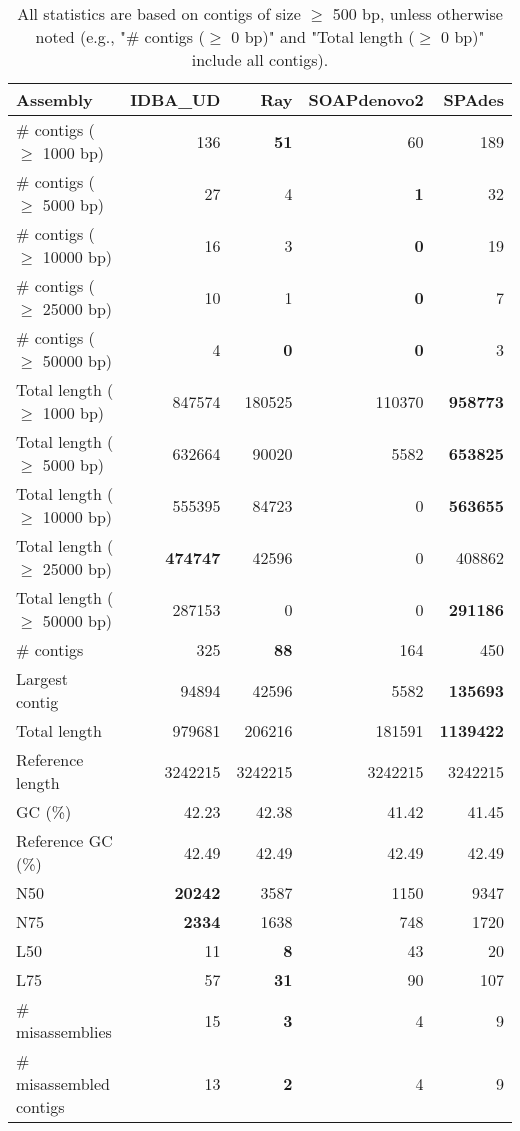 \documentclass[12pt,a4paper]{article}
\begin{document}
\begin{table}[ht]
\begin{center}
\caption{All statistics are based on contigs of size $\geq$ 500 bp, unless otherwise noted (e.g., "\# contigs ($\geq$ 0 bp)" and "Total length ($\geq$ 0 bp)" include all contigs).}
\begin{tabular}{|l*{4}{|r}|}
\hline
Assembly & IDBA\_UD & Ray & SOAPdenovo2 & SPAdes \\ \hline
\# contigs ($\geq$ 1000 bp) & 136 & {\bf 51} & 60 & 189 \\ \hline
\# contigs ($\geq$ 5000 bp) & 27 & 4 & {\bf 1} & 32 \\ \hline
\# contigs ($\geq$ 10000 bp) & 16 & 3 & {\bf 0} & 19 \\ \hline
\# contigs ($\geq$ 25000 bp) & 10 & 1 & {\bf 0} & 7 \\ \hline
\# contigs ($\geq$ 50000 bp) & 4 & {\bf 0} & {\bf 0} & 3 \\ \hline
Total length ($\geq$ 1000 bp) & 847574 & 180525 & 110370 & {\bf 958773} \\ \hline
Total length ($\geq$ 5000 bp) & 632664 & 90020 & 5582 & {\bf 653825} \\ \hline
Total length ($\geq$ 10000 bp) & 555395 & 84723 & 0 & {\bf 563655} \\ \hline
Total length ($\geq$ 25000 bp) & {\bf 474747} & 42596 & 0 & 408862 \\ \hline
Total length ($\geq$ 50000 bp) & 287153 & 0 & 0 & {\bf 291186} \\ \hline
\# contigs & 325 & {\bf 88} & 164 & 450 \\ \hline
Largest contig & 94894 & 42596 & 5582 & {\bf 135693} \\ \hline
Total length & 979681 & 206216 & 181591 & {\bf 1139422} \\ \hline
Reference length & 3242215 & 3242215 & 3242215 & 3242215 \\ \hline
GC (\%) & 42.23 & 42.38 & 41.42 & 41.45 \\ \hline
Reference GC (\%) & 42.49 & 42.49 & 42.49 & 42.49 \\ \hline
N50 & {\bf 20242} & 3587 & 1150 & 9347 \\ \hline
N75 & {\bf 2334} & 1638 & 748 & 1720 \\ \hline
L50 & 11 & {\bf 8} & 43 & 20 \\ \hline
L75 & 57 & {\bf 31} & 90 & 107 \\ \hline
\# misassemblies & 15 & {\bf 3} & 4 & 9 \\ \hline
\# misassembled contigs & 13 & {\bf 2} & 4 & 9 \\ \hline

\end{tabular}
\end{center}
\end{table}
\end{document}
